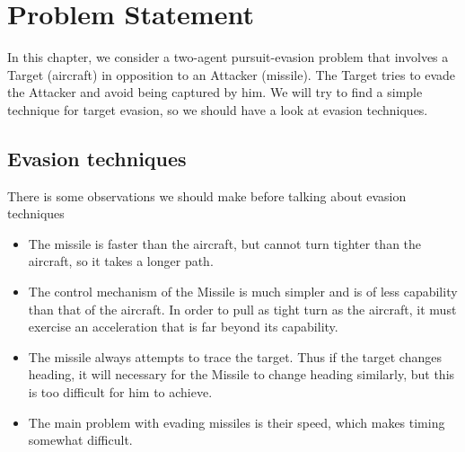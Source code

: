 \section{Problem Statement}
In this chapter, we consider a two-agent pursuit-evasion problem that involves  a Target (aircraft) in opposition to an Attacker (missile). The Target tries to evade the Attacker and avoid being captured by him. We will try to find a simple technique for target evasion, so we should have a look at evasion techniques.

\subsection{Evasion techniques}
There is some observations we should make before talking about evasion techniques 
\begin{itemize}
	\item The missile is faster than the aircraft, but cannot turn tighter than the aircraft, so it takes a longer path.
	\item The control mechanism of the Missile is much simpler and is of less capability than that of the aircraft. In order to pull as tight turn as the aircraft, it must exercise an acceleration that is far beyond its capability.
	\item The missile always attempts to trace the target. Thus if the target changes heading, it will necessary for the Missile to change heading similarly, but this is too difficult for him to achieve.
	\item  The main problem with evading missiles is their speed, which makes timing somewhat difficult.
\end{itemize}

